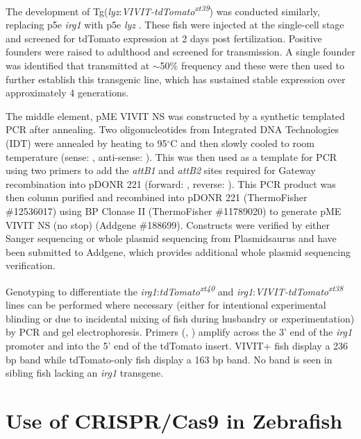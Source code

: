 The development of Tg(\textit{lyz}:\textit{VIVIT-tdTomato\textsuperscript{xt39}}) was conducted similarly, replacing p5e \textit{irg1} with p5e \textit{lyz} \citep{Hall2007}. These fish were injected at the single-cell stage and screened for tdTomato expression at 2 days post fertilization. Positive founders were raised to adulthood and screened for transmission. A single founder was identified that transmitted at $\sim$50\% frequency and these were then used to further establish this transgenic line, which has sustained stable expression over approximately 4 generations.

The middle element, pME VIVIT NS was constructed by a synthetic templated PCR after annealing. Two oligonucleotides from Integrated DNA Technologies (IDT) were annealed by heating to 95$^{\circ}$C and then slowly cooled to room temperature (sense: , anti\hyp{}sense: ). This was then used as a template for PCR using two primers to add the \textit{attB1} and \textit{attB2} sites required for Gateway recombination into pDONR 221 (forward: , reverse: ). This PCR product was then column purified and recombined into pDONR 221 (ThermoFisher \#12536017) using BP Clonase II (ThermoFisher \#11789020) to generate pME VIVIT NS (no stop) (Addgene \#188699). Constructs were verified by either Sanger sequencing or whole plasmid sequencing from Plasmidsaurus and have been submitted to Addgene, which provides additional whole plasmid sequencing verification.

Genotyping to differentiate the \textit{irg1}:\textit{tdTomato\textsuperscript{xt40}} and \textit{irg1}:\textit{VIVIT\hyp{}tdTomato\textsuperscript{xt38}} lines can be performed where necessary (either for intentional experimental blinding or due to incidental mixing of fish during husbandry or experimentation) by PCR and gel electrophoresis. Primers (, ) amplify across the 3' end of the \textit{irg1} promoter and into the 5' end of the tdTomato insert. VIVIT+ fish display a 236 bp band while tdTomato\hyp{}only fish display a 163 bp band. No band is seen in sibling fish lacking an \textit{irg1} transgene. 

\section{Use of CRISPR/Cas9 in Zebrafish}\label{crispr}

